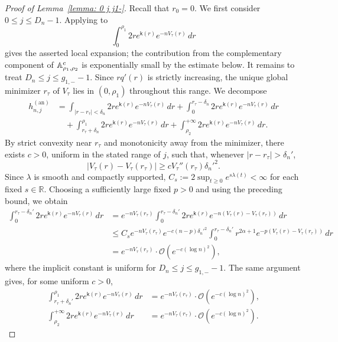 \documentclass[a4paper]{article}
\numberwithin{equation}{section}
\begin{document}
\begin{proof}[Proof of Lemma~\ref{lemma: 0 j j1-}]
Recall that $r_0=0$. We first consider $0\leq j\leq D_n-1$. Applying \cite[Lemma~4.1]{ACC2023c} to
\[
\int_{0}^{\rho_1}2r e^{\mathsf{k}(r)}e^{-nV_{\tau}(r)}\,dr
\]
gives the asserted local expansion; the contribution from the complementary component of $\mathbb A_{\rho_1,\rho_2}^{\rm c}$ is exponentially small by the estimate below.
It remains to treat $D_n\leq j\leq g_{1,-}-1$.
Since $rq'(r)$ is strictly increasing, the unique global minimizer $r_\tau$ of $V_\tau$ lies in $(0,\rho_1)$ throughout this range. We decompose
\begin{align*}
h_{n,j}^{(\mathrm{an})}
&=\int_{|r-r_{\tau}|<\delta_n}2r e^{\mathsf{k}(r)}e^{-nV_{\tau}(r)}\,dr
+\int_0^{r_{\tau}-\delta_n}2r e^{\mathsf{k}(r)}e^{-nV_{\tau}(r)}\,dr
\\
&\quad
+\int_{r_{\tau}+\delta_n}^{\rho_1}2r e^{\mathsf{k}(r)}e^{-nV_{\tau}(r)}\,dr
+\int_{\rho_2}^{+\infty}2r e^{\mathsf{k}(r)}e^{-nV_{\tau}(r)}\,dr.
\end{align*}
By strict convexity near $r_\tau$ and monotonicity away from the minimizer, there exists $c>0$, uniform in the stated range of $j$, such that, whenever $|r-r_\tau|>\delta_n'$,
\[
|V_{\tau}(r)-V_{\tau}(r_{\tau})|\geq c V_{\tau}''(r_{\tau}){\delta_n'}^2. 
\]
Since $\lambda$ is smooth and compactly supported, $C_s:=2\sup_{t\geq0}e^{s\lambda(t)}<\infty$ for each fixed $s\in\mathbb R$. Choosing a sufficiently large fixed $p>0$ and using the preceding bound, we obtain
\begin{align*}
\int_0^{r_{\tau}-\delta_n'}2r e^{\mathsf{k}(r)}e^{-nV_{\tau}(r)}\,dr
&=e^{-nV_{\tau}(r_{\tau})}\int_0^{r_{\tau}-\delta_n'}2r e^{\mathsf{k}(r)} e^{-n(V_{\tau}(r)-V_{\tau}(r_{\tau}))}\,dr
\\
&\leq C_se^{-nV_{\tau}(r_{\tau})}e^{-c(n-p){\delta_n'}^2}
\int_0^{r_{\tau}-\delta_n'}r^{2\alpha+1}e^{-p(V_{\tau}(r)-V_{\tau}(r_{\tau}))}\,dr
\\
&=e^{-nV_{\tau}(r_{\tau})}\cdot\mathcal{O}(e^{-c(\log n)^2}),
\end{align*}
where the implicit constant is uniform for $D_n\leq j\leq g_{1,-}-1$. The same argument gives, for some uniform $c>0$,
\begin{align*}
\int_{r_{\tau}+\delta_n'}^{\rho_1}2r e^{\mathsf{k}(r)}e^{-nV_{\tau}(r)}\,dr&=e^{-nV_{\tau}(r_{\tau})}\cdot\mathcal{O}(e^{-c(\log n)^2}),\\
\int_{\rho_2}^{+\infty}2r e^{\mathsf{k}(r)}e^{-nV_{\tau}(r)}\,dr&=e^{-nV_{\tau}(r_{\tau})}\cdot\mathcal{O}(e^{-c(\log n)^2}).

\end{align*}
\end{proof}
\end{document}
